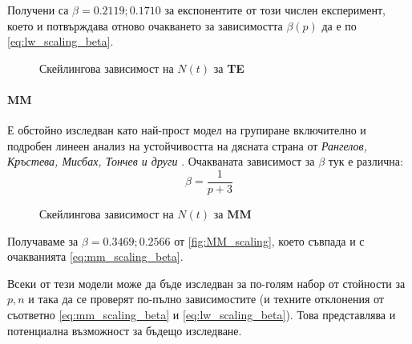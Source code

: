Получени са $\beta = 0.2119; 0.1710$ за експонентите от този числен експеримент, което и потвърждава отново очакването за зависимостта $\beta(p)$ да е по \autoref{eq:lw_scaling_beta}.
\begin{figure}[hbpt]
    \centering
    \caption{Скейлингова зависимост на $N(t)$ за \textbf{TE}}
    \label{fig:TE_scaling}
\end{figure}

\paragraph{MM} Е обстойно изследван като най-прост модел на групиране включително и подробен линеен анализ на устойчивостта на дясната страна  от \textit{Рангелов, Кръстева, Мисбах, Тончев и други} \cite{Ranguelov2012}. Очакваната зависимост за $\beta$ тук е различна:
\begin{equation}
    \beta = \frac{1}{p+3}
    \label{eq:mm_scaling_beta}
\end{equation} 
\begin{figure}[hbpt]
    \centering
    \caption{Скейлингова зависимост на $N(t)$ за \textbf{MM}}
    \label{fig:MM_scaling}
\end{figure}

Получаваме за $\beta = 0.3469; 0.2566$ от \autoref{fig:MM_scaling}, което съвпада и с очакванията \autoref{eq:mm_scaling_beta}.

Всеки от тези модели може да бъде изследван за по-голям набор от стойности за $p, n$ и така да се проверят по-пълно зависимостите (и техните отклонения от съответно \autoref{eq:mm_scaling_beta} и \autoref{eq:lw_scaling_beta}). Това представлява и потенциална възможност за бъдещо изследване.

